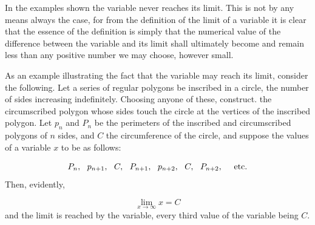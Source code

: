 


In the examples shown the variable never reaches its limit. 
This is not by any means always the case, for from the definition 
of the limit of a variable it is clear that the essence of the 
definition is simply that the numerical value of the difference 
between the variable and its limit shall ultimately become and 
remain less than any positive number we may choose, however small.

\begin{example}
As an example illustrating the fact that the variable may 
reach its limit, consider the following. Let a series of regular 
polygons be inscribed in a circle, the number of sides increasing 
indefinitely. Choosing anyone of these, construct. the circumscribed 
polygon whose sides touch the circle at the vertices of the inscribed
polygon. Let $p_n$ and $P_n$ be the perimeters of the inscribed and 
circumscribed polygons of $n$ sides, and $C$ the circumference 
of the circle, and suppose the values of a variable $x$ to be as follows:

\[
 P_n,\ \  p_{n + 1},\ \  C,\ \  P_{n + 1},\ \  p_{n + 2},\ \  C,\ \  P_{n + 2},
\ \ \ \ {\rm etc.}
\]
Then, evidently,

\[
    \lim_{x \to \infty} x = C
\]
and the limit is reached by the variable, every third value of the 
variable being $C$.
\end{example}

